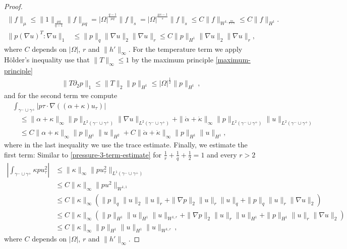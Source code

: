 \documentclass{article}
\theoremstyle{definition}
\theoremstyle{definition}
\begin{document}
\begin{proof}
{\begin{align*}
    \|f\|_\mu \leq \|1\|_{\frac{\mu q}{q-1}}\|f\|_{\mu q} = |\Omega|^{\frac{q-1}{\mu q}}\|f\|_s =|\Omega|^{\frac{\mu s-1}{s}}\|f\|_s \leq C \|f\|_{W^{1,\frac{ns}{n+s}}} \leq C \|f\|_{H^1}.
\end{align*}
}
\begin{align}
    \label{pressure-3-term-estimate}
    \|p(\nabla u)^T\colon \nabla u\|_1 &\leq \|p\|_q \|\nabla u\|_2 \|\nabla u\|_r 
    \leq C \|p\|_{H^1} \|\nabla u\|_2 \|\nabla u\|_r,
\end{align}
where $C$ depends on $|\Omega|$, $r$ and $\|h'\|_{\infty}$. For the temperature term we apply H\"older's inequality use that $\|T\|_\infty\leq 1$ by the maximum principle \eqref{maximum-principle}
\begin{align*}
    \|T\partial_2 p\|_1\leq \|T\|_2 \|p\|_{H^1}\leq |\Omega|^\frac{1}{2} \|p\|_{H^1}\,,
\end{align*}
and for the second term we compute
\begin{align*}
    &\int_{\gamma^-\cup\gamma^+} \left|p \tau\cdot \nabla ((\alpha+\kappa)u_{\tau})\right|
    \\
    &\quad\leq \|\alpha+\kappa\|_\infty\|p\|_{L^2(\gamma^-\cup\gamma^+)} \|\nabla u\|_{L^2(\gamma^-\cup\gamma^+)} + \|\dot\alpha+\dot\kappa\|_\infty \|p\|_{L^2(\gamma^-\cup\gamma^+)}\|u\|_{L^2(\gamma^-\cup\gamma^+)}
    \\
    &\quad\leq C \|\alpha+\kappa\|_\infty \|p\|_{H^1} \|u\|_{H^2} + C \|\dot\alpha+\dot\kappa\|_\infty \|p\|_{H^1} \|u\|_{H^1},
\end{align*}
where in the last inequality we use the trace estimate.
Finally, we estimate the first term: Similar to \eqref{pressure-3-term-estimate} for $\frac{1}{r}+\frac{1}{q}+\frac{1}{2}=1$ and every $r>2$
\begin{align*}
    \left|\int_{\gamma^-\cup \gamma^+} \kappa p u_\tau^2\right| &\leq \|\kappa\|_\infty \|pu_\tau^2\|_{L^1(\gamma^-\cup\gamma^+)}\\
    &\leq C\|\kappa\|_\infty  \|pu^2\|_{W^{1,1}} \\
    &\leq C\|\kappa\|_\infty \left( \|p\|_q \|u\|_2\|u\|_r + \|\nabla p\|_2 \|u\|_r \|u\|_q + \| p \|_q \|u\|_r \|\nabla u\|_2\right)\\
    &\leq C\|\kappa\|_\infty \left( \|p\|_{H^1} \|u\|_{H^1}\| u\|_{W^{1,r}} + \|\nabla p\|_2 \|u\|_r \|u\|_{H^1} + \| p \|_{H^1} \|u\|_r \|\nabla u\|_2\right)\\
    &\leq C \|\kappa\|_\infty \|p\|_{H^1} \|u\|_{H^1}\| u\|_{W^{1,r}}\,,
\end{align*}
where $C$ depends on $|\Omega|$, $r$ and $\|h'\|_{\infty}$.


\end{proof}
\end{document}
